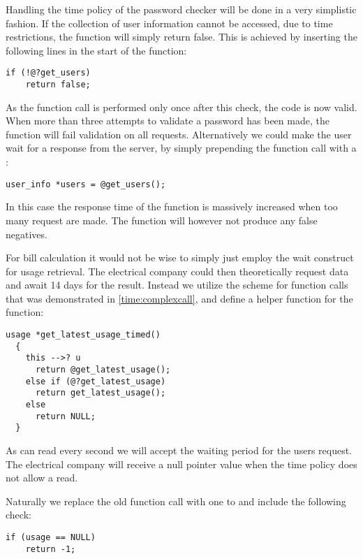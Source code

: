 Handling the time policy of the password checker will be done in a very simplistic fashion.
If the collection of user information cannot be accessed, due to time restrictions, the function will simply return false.
This is achieved by inserting the following lines in the start of the function:

\begin{lstlisting}[style=dlmc]
  if (!@?get_users)
    return false;
\end{lstlisting}

As the  function call is performed only once after this check, the code is now valid.
When more than three attempts to validate a password has been made, the function will fail validation on all requests.
Alternatively we could make the user wait for a response from the server, by simply prepending the  function call with a :

\begin{lstlisting}[style=dlmc]
  user_info *users = @get_users();
\end{lstlisting}

In this case the response time of the function is massively increased when too many request are made.
The function will however not produce any false negatives.

For bill calculation it would not be wise to simply just employ the  wait construct for usage retrieval.
The electrical company could then theoretically request data and await 14 days for the result.
Instead we utilize the scheme for function calls that was demonstrated in \cref{time:complexcall}, and define a helper function for the  function:

\begin{lstlisting}[style=dlmc]
  usage *get_latest_usage_timed()
  {
    this -->? u
      return @get_latest_usage();
    else if (@?get_latest_usage)
      return get_latest_usage();
    else
      return NULL;
  }
\end{lstlisting}

As  can read every second we will accept the waiting period for the users request.
The electrical company will receive a null pointer value when the time policy does not allow a read.

Naturally we replace the old  function call with one to  and include the following check:
\begin{lstlisting}[style=dlmc]
  if (usage == NULL)
    return -1;
\end{lstlisting}

